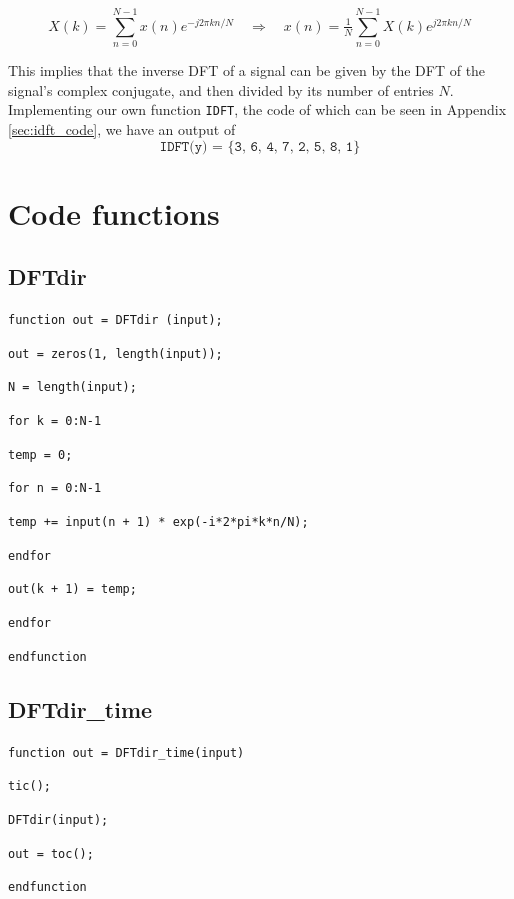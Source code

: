 \documentclass[a4paper, 12pt]{report}
\begin{document}
			\begin{equation}
				X(k) = \sum^{N-1}_{n=0} x(n) e^{-j 2 \pi k n / N}\quad \Rightarrow \quad x(n) = \tfrac{1}{N} \sum^{N-1}_{n=0} X(k) e^{j 2 \pi k n / N}
			\end{equation}

			This implies that the inverse DFT of a signal can be given by the DFT of the signal's complex conjugate, and then divided by its number of entries $N$. Implementing our own function \texttt{IDFT}, the code of which can be seen in Appendix \ref{sec:idft_code}, we have an output of
			\[
				\texttt{IDFT(y) = \{3, 6, 4, 7, 2, 5, 8, 1\}} 
			\]

	\appendix
	\chapter{Code functions} %
	\label{sec:dftdir_code}
		\section{DFTdir} %
		\label{sec:dftdir}
			\texttt{function out = DFTdir (input);}\par
			\texttt{out = zeros(1, length(input));}\par
			\indent\texttt{N = length(input);}\par
			\texttt{for k = 0:N-1}\par
			\hspace*{2em}\texttt{temp = 0;}\par
			\hspace*{2em}\texttt{for n = 0:N-1}\par
			\hspace*{4em}\texttt{temp += input(n + 1) * exp(-i*2*pi*k*n/N);}\par
			\hspace*{2em}\texttt{endfor}\par
			\hspace*{2em}\texttt{out(k + 1) = temp;}\par
			\texttt{endfor}\par
			\noindent\texttt{endfunction}\par

		\section{DFTdir\_time} %
		\label{sec:dftdir_time_code}
			\texttt{function out = DFTdir\_time(input)}\par{}
			\texttt{tic();}\par
			\texttt{DFTdir(input);}\par
			\texttt{out = toc();}\par
			\texttt{endfunction}\par
\end{document}
